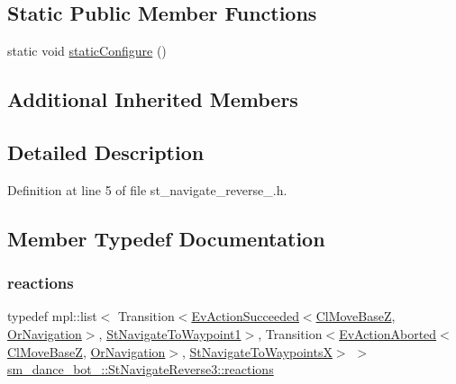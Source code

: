 \subsection*{Static Public Member Functions}
\begin{DoxyCompactItemize}
\item 
static void \hyperlink{structsm__dance__bot__2_1_1StNavigateReverse3_ab9ffbcdda77a9655dc05926ba5b67692}{static\+Configure} ()
\end{DoxyCompactItemize}
\subsection*{Additional Inherited Members}


\subsection{Detailed Description}


Definition at line 5 of file st\+\_\+navigate\+\_\+reverse\+\_.\+h.



\subsection{Member Typedef Documentation}
\mbox{\label{structsm__dance__bot__2_1_1StNavigateReverse3_a82697735f3009a034d770010306c1390}} 
\subsubsection{\texorpdfstring{reactions}{reactions}}
{\footnotesize\ttfamily typedef mpl\+::list$<$ Transition$<$\hyperlink{structsmacc_1_1default__events_1_1EvActionSucceeded}{Ev\+Action\+Succeeded}$<$\hyperlink{classcl__move__base__z_1_1ClMoveBaseZ}{Cl\+Move\+BaseZ}, \hyperlink{classsm__dance__bot__2_1_1OrNavigation}{Or\+Navigation}$>$, \hyperlink{structsm__dance__bot__2_1_1StNavigateToWaypoint1}{St\+Navigate\+To\+Waypoint1}$>$, Transition$<$\hyperlink{structsmacc_1_1default__events_1_1EvActionAborted}{Ev\+Action\+Aborted}$<$\hyperlink{classcl__move__base__z_1_1ClMoveBaseZ}{Cl\+Move\+BaseZ}, \hyperlink{classsm__dance__bot__2_1_1OrNavigation}{Or\+Navigation}$>$, \hyperlink{structsm__dance__bot__2_1_1StNavigateToWaypointsX}{St\+Navigate\+To\+WaypointsX}$>$ $>$ \hyperlink{structsm__dance__bot__2_1_1StNavigateReverse3_a82697735f3009a034d770010306c1390}{sm\+\_\+dance\+\_\+bot\+\_\+::\+St\+Navigate\+Reverse3\+::reactions}}



